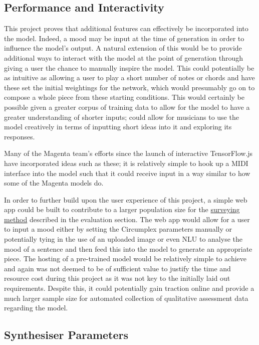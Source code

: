 \documentclass[12pt,]{article}
\begin{document}
\hypertarget{performance-and-interactivity}{%
\subsection{Performance and
Interactivity}\label{performance-and-interactivity}}

This project proves that additional features can effectively be
incorporated into the model. Indeed, a mood may be input at the time of
generation in order to influence the model's output. A natural extension
of this would be to provide additional ways to interact with the model
at the point of generation through giving a user the chance to manually
inspire the model. This could potentially be as intuitive as allowing a
user to play a short number of notes or chords and have these set the
initial weightings for the network, which would presumably go on to
compose a whole piece from these starting conditions. This would
certainly be possible given a greater corpus of training data to allow
for the model to have a greater understanding of shorter inputs; could
allow for musicians to use the model creatively in terms of inputting
short ideas into it and exploring its responses.

Many of the Magenta team's efforts since the launch of interactive
TensorFlow.js have incorporated ideas such as these; it is relatively
simple to hook up a MIDI interface into the model such that it could
receive input in a way similar to how some of the Magenta models do.

In order to further build upon the user experience of this project, a
simple web app could be built to contribute to a larger population size
for the \protect\hyperlink{qualitativesurveryingmethod}{surveying
method} described in the evaluation section. The web app would allow for
a user to input a mood either by setting the Circumplex parameters
manually or potentially tying in the use of an uploaded image or even
NLU to analyse the mood of a sentence and then feed this into the model
to generate an appropriate piece. The hosting of a pre-trained model
would be relatively simple to achieve and again was not deemed to be of
sufficient value to justify the time and resource cost during this
project as it was not key to the initially laid out requirements.
Despite this, it could potentially gain traction online and provide a
much larger sample size for automated collection of qualitative
assessment data regarding the model.

\hypertarget{synthesiser-parameters}{%
\subsection{Synthesiser Parameters}\label{synthesiser-parameters}}
\end{document}
